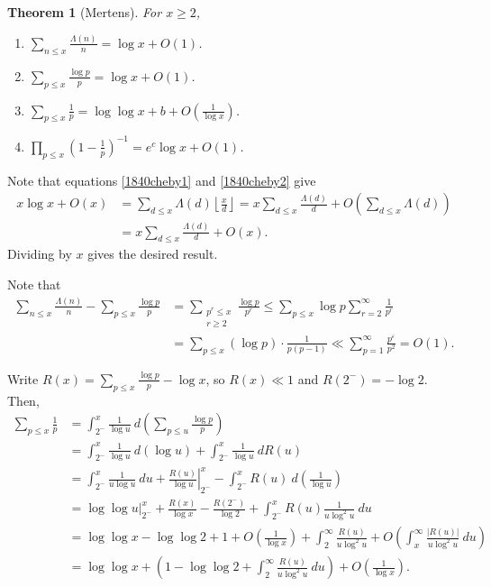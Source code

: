 \documentclass[11pt]{article}
\newtheorem{thm}{Theorem}[subsection]
\theoremstyle{definition}
\newcommand{\floor}[1]{\left\lfloor #1 \right\rfloor}
\newcommand{\e}[0]{\varepsilon}
\newcommand{\La}[0]{\Lambda}
\newcommand{\abs}[1]{\left\lvert#1\right\rvert} %
\begin{document}
\begin{thm}[Mertens] \label{thm:2.7}
For $x\ge2$,
\begin{enumerate}
\item $\sum_{n\le x}\frac{\La(n)}{n} = \log x + O(1)$.
\item $\sum_{p\le x}\frac{\log p}{p} = \log x + O(1)$.
\item $\sum_{p\le x}\frac1p = \log\log x + b + O\left(\frac1{\log x}\right)$.
\item $\prod_{p\le x}\left(1-\frac1p\right)^{-1} = e^c\log x + O(1)$.
\end{enumerate}
\end{thm}

\proof[Proof of (a)]
Note that equations \ref{1840cheby1} and \ref{1840cheby2} give
\begin{align*}
x\log x + O(x) &= \sum_{d\le x}\La(d)\floor{\frac{x}d}
= x\sum_{d\le x}\frac{\La(d)}d + O\left(\sum_{d\le x}\La(d)\right) \\
&= x\sum_{d\le x}\frac{\La(d)}d + O(x) .
\end{align*}
Dividing by $x$ gives the desired result.
\qedhere

\proof[Proof of (b)]
Note that
\begin{align*}
\sum_{n\le x}\frac{\La(n)}n - \sum_{p\le x} \frac{\log p}p
&= \sum_{\substack{p^r\le x\\r\ge2}} \frac{\log p}{p^r}
\le \sum_{p\le x} \log p \sum_{r=2}^\infty \frac1{p^r} \\
&= \sum_{p\le x}(\log p)\cdot\frac{1}{p(p-1)}
\ll \sum_{p=1}^\infty \frac{p^\e}{p^2} = O(1) .
\end{align*}
\qedhere


\proof[Proof of (d)]
Write $R(x)=\sum_{p\le x}\frac{\log p}p-\log x$, so $R(x)\ll1$ and $R(2^-)=-\log2$. Then,
\begin{align*}
\sum_{p\le x}\frac1p
&= \int_{2^-}^x \frac1{\log u} ~d\left(\sum_{p\le u}\frac{\log p}p\right) \\
&= \int_{2^-}^x \frac1{\log u} ~d(\log u) + \int_{2^-}^x\frac1{\log u} ~dR(u) \\
&= \int_{2^-}^x \frac1{u\log u} ~du + \left.\frac{R(u)}{\log u}\right|_{2^-}^x
- \int_{2^-}^x R(u) ~d\left(\frac1{\log u}\right) \\
&= \left.\log\log u\right|_{2^-}^x + \frac{R(x)}{\log x} - \frac{R(2^-)}{\log2}
+ \int_{2^-}^x R(u)\frac1{u\log^2u}~du \\
&= \log\log x-\log\log2 + 1 + O\left(\frac1{\log x}\right)
+ \int_2^\infty \frac{R(u)}{u\log^2u}
+ O\left(\int_x^\infty\frac{\abs{R(u)}}{u\log^2u}~du\right) \\
&= \log\log x + \left(1-\log\log2 + \int_2^\infty\frac{R(u)}{u\log^2u}~du\right)
+ O\left(\frac1{\log x}\right) .
\end{align*}
\qedhere
\end{document}
